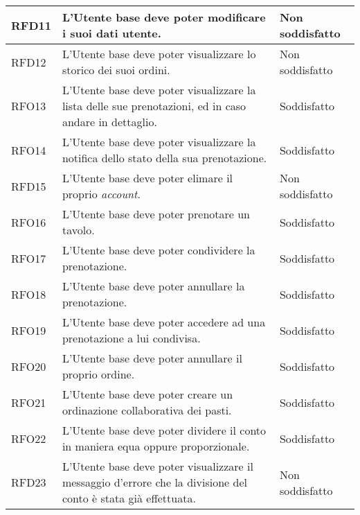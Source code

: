 \begin{longtable}{|l|p{}|p{3cm}|}
	\hline
	RFD11       & L'Utente base deve poter modificare i suoi dati utente.                                                                      & Non soddisfatto \\
	\hline
	RFD12       & L'Utente base deve poter visualizzare lo storico dei suoi ordini.                                                            & Non soddisfatto \\
	\hline
	RFO13       & L'Utente base deve poter visualizzare la lista delle sue prenotazioni, ed in caso andare in dettaglio.                       & Soddisfatto     \\
	\hline
	RFO14       & L'Utente base deve poter visualizzare la notifica dello stato della sua prenotazione.                                        & Soddisfatto     \\
	\hline
	RFD15       & L'Utente base deve poter elimare il proprio \textit{account}.                                                                & Non soddisfatto \\
	\hline
	RFO16       & L'Utente base deve poter prenotare un tavolo.                                                                                & Soddisfatto     \\
	\hline
	RFO17       & L'Utente base deve poter condividere la prenotazione.                                                                        & Soddisfatto     \\
	\hline
	RFO18       & L'Utente base deve poter annullare la prenotazione.                                                                          & Soddisfatto     \\
	\hline
	RFO19       & L'Utente base deve poter accedere ad una prenotazione a lui condivisa.                                                       & Soddisfatto     \\
	\hline
	RFO20       & L'Utente base deve poter annullare il proprio ordine.                                                                        & Soddisfatto     \\
	\hline
	RFO21       & L'Utente base deve poter creare un ordinazione collaborativa dei pasti.                                                      & Soddisfatto     \\
	\hline
	RFO22       & L'Utente base deve poter dividere il conto in maniera equa oppure proporzionale.                                             & Soddisfatto     \\
	\hline
	RFD23       & L'Utente base deve poter visualizzare il messaggio d'errore che la divisione del conto è stata già effettuata.               & Non soddisfatto \\

\end{longtable}
